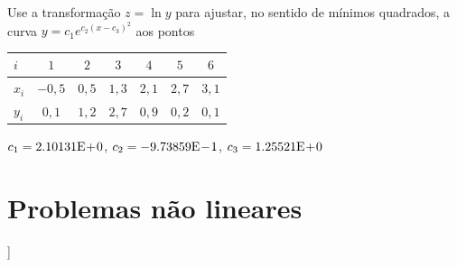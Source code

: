 \begin{exer}
  Use a transformação $z = \ln y$ para ajustar, no sentido de mínimos quadrados, a curva $y = c_1e^{c_2(x-c_3)^2}$ aos pontos
  \begin{center}
    \begin{tabular}{l|cccccc}
      $i$ & $1$ & $2$ & $3$ & $4$ & $5$ & $6$ \\\hline
      $x_i$ & $-0,5$ & $0,5$ & $1,3$ & $2,1$ & $2,7$ & $3,1$ \\
      $y_i$ & $0,1$ & $1,2$ & $2,7$ & $0,9$ & $0,2$ & $0,1$ \\\hline
    \end{tabular}
  \end{center}
\end{exer}
\begin{resp}
  $c_1 = 2.10131\mathrm{E}\!+\!0$, $c_2 = -9.73859\mathrm{E}\!-\!1$, $c_3 = 1.25521\mathrm{E}\!+\!0$
\end{resp}
   
\section{Problemas não lineares}\label{cap_ajuste_sec_prob_nlin}

\begin{flushleft}
  [[tag:revisar]]
\end{flushleft}

